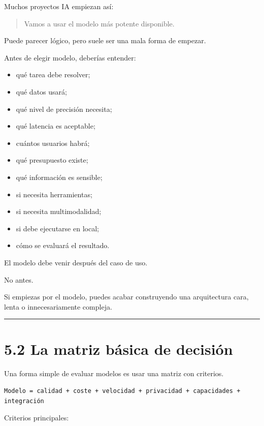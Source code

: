 Muchos proyectos IA empiezan así:

\begin{quote}
Vamos a usar el modelo más potente disponible.
\end{quote}

Puede parecer lógico, pero suele ser una mala forma de empezar.

Antes de elegir modelo, deberías entender:

\begin{itemize}
\tightlist
\item
  qué tarea debe resolver;
\item
  qué datos usará;
\item
  qué nivel de precisión necesita;
\item
  qué latencia es aceptable;
\item
  cuántos usuarios habrá;
\item
  qué presupuesto existe;
\item
  qué información es sensible;
\item
  si necesita herramientas;
\item
  si necesita multimodalidad;
\item
  si debe ejecutarse en local;
\item
  cómo se evaluará el resultado.
\end{itemize}

El modelo debe venir después del caso de uso.

No antes.

Si empiezas por el modelo, puedes acabar construyendo una arquitectura
cara, lenta o innecesariamente compleja.

\begin{center}\rule{0.5\linewidth}{0.5pt}\end{center}

\section{5.2 La matriz básica de
decisión}\label{la-matriz-buxe1sica-de-decisiuxf3n}

Una forma simple de evaluar modelos es usar una matriz con criterios.

\begin{lstlisting}
Modelo = calidad + coste + velocidad + privacidad + capacidades + integración
\end{lstlisting}

Criterios principales:

